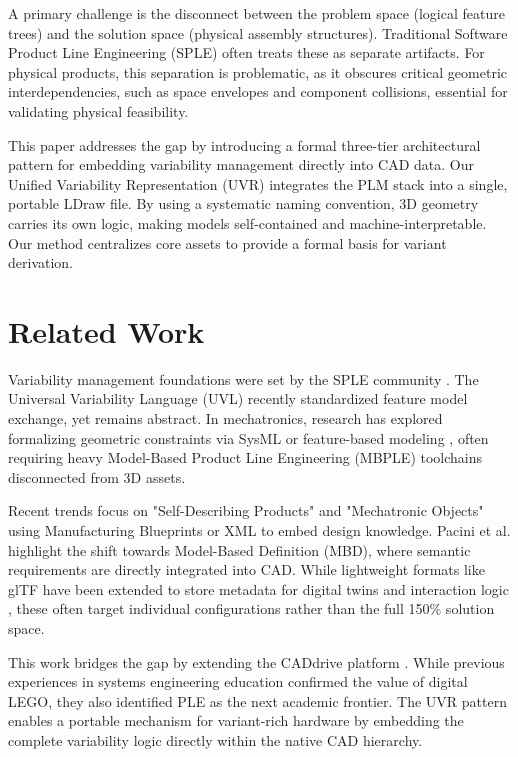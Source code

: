 \documentclass[runningheads]{llncs}
\begin{document}
A primary challenge is the disconnect between the problem space (logical feature trees) and the solution space (physical assembly structures). Traditional Software Product Line Engineering (SPLE) \cite{Pohl2005} often treats these as separate artifacts. For physical products, this separation is problematic, as it obscures critical geometric interdependencies, such as space envelopes and component collisions, essential for validating physical feasibility.

This paper addresses the gap by introducing a formal three-tier architectural pattern for embedding variability management directly into CAD data. Our Unified Variability Representation (UVR) integrates the PLM stack into a single, portable LDraw file. By using a systematic naming convention, 3D geometry carries its own logic, making models self-contained and machine-interpretable. Our method centralizes core assets to provide a formal basis for variant derivation.

\section{Related Work}

Variability management foundations were set by the SPLE community \cite{Pohl2005, Linden2007}. The Universal Variability Language (UVL) \cite{Benavides2025UVL} recently standardized feature model exchange, yet remains abstract. In mechatronics, research has explored formalizing geometric constraints via SysML \cite{warniez2014sysml} or feature-based modeling \cite{Koch2016}, often requiring heavy Model-Based Product Line Engineering (MBPLE) toolchains \cite{guzel2024model} disconnected from 3D assets.

Recent trends focus on "Self-Describing Products" \cite{Papazoglou2025Industry40} and "Mechatronic Objects" \cite{siltala2016formal} using Manufacturing Blueprints or XML to embed design knowledge. Pacini et al. \cite{Pacini2026Semantically} highlight the shift towards Model-Based Definition (MBD), where semantic requirements are directly integrated into CAD. While lightweight formats like glTF have been extended to store metadata for digital twins \cite{barzaghi_reproducible_2025} and interaction logic \cite{rasheed2023makerspace}, these often target individual configurations rather than the full 150\% solution space.

This work bridges the gap by extending the CADdrive platform \cite{Hackenberg2023}. While previous experiences in systems engineering education \cite{Hackenberg2025, KuiterTK25} confirmed the value of digital LEGO, they also identified PLE as the next academic frontier. The UVR pattern enables a portable mechanism for variant-rich hardware by embedding the complete variability logic directly within the native CAD hierarchy.
\end{document}
